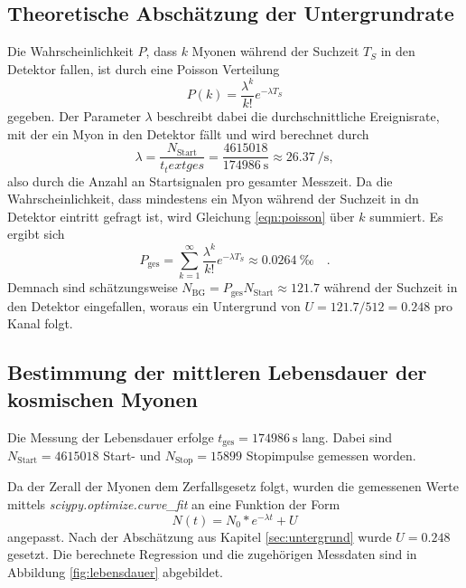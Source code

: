 \subsection*{Theoretische Abschätzung der Untergrundrate}
\label{sec:untergrund}
Die Wahrscheinlichkeit $P$, dass $k$ Myonen während der Suchzeit $T_S$ in den Detektor fallen, ist durch eine Poisson Verteilung
\begin{equation}
  P(k)=\frac{\lambda^k}{k!}e^{-\lambda T_S} \label{eqn:poisson}
\end{equation}
gegeben. Der Parameter $\lambda$ beschreibt dabei die durchschnittliche Ereignisrate, mit der ein Myon in den Detektor fällt und wird berechnet durch 
\begin{equation}
  \lambda=\frac{N_\text{Start}}{t_text{ges}}=\frac{\num{4615018}}{\SI{174986}{\second}}\approx \SI{26.37}{\per\second},
\end{equation}
also durch die Anzahl an Startsignalen pro gesamter Messzeit. Da die Wahrscheinlichkeit, dass mindestens ein Myon während der Suchzeit in dn Detektor eintritt
gefragt ist, wird Gleichung \ref{eqn:poisson} über $k$ summiert. Es ergibt sich
\begin{equation*}
  P_{\text{ges}}=\sum_{k=1}^\infty\frac{\lambda^k}{k!}e^{-\lambda T_S}\approx\SI{0.0264}{‰}\quad .
\end{equation*}
Demnach sind schätzungsweise $N_{\text{BG}}=P_{\text{ges}}N_{\text{Start}}\approx\num{121.7}$ während der Suchzeit in den Detektor eingefallen, woraus ein Untergrund
von $U=121.7/512=0.248$ pro Kanal folgt.

\subsection*{Bestimmung der mittleren Lebensdauer der kosmischen Myonen}
Die Messung der Lebensdauer erfolge $t_\text{ges}=\SI{174986}{\second}$ lang. Dabei sind $N_\text{Start}=\num{4615018}$ Start- und  $N_\text{Stop}=\num{15899}$
Stopimpulse gemessen worden. 

Da der Zerall der Myonen dem Zerfallsgesetz folgt, wurden die gemessenen Werte mittels \textit{sciypy.optimize.curve\_fit} an eine Funktion der Form 
\begin{equation}
  N(t)=N_0*e^{-\lambda t}+U \label{eqn:expo}
\end{equation}
angepasst. Nach der Abschätzung aus Kapitel \ref{sec:untergrund} wurde $U=0.248$ gesetzt. Die berechnete Regression und die zugehörigen Messdaten sind in Abbildung 
\ref{fig:lebensdauer} abgebildet.

